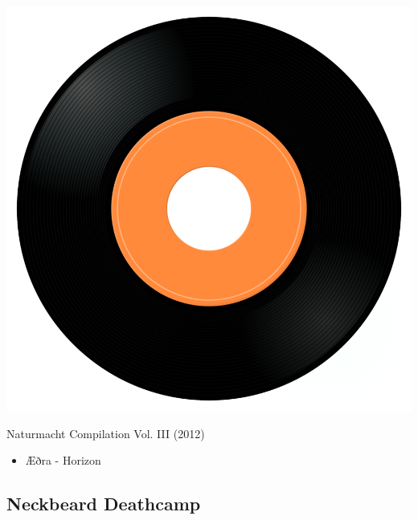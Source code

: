 \begin{minipage}[t]{0.25\textwidth}\vspace{0pt}
\captionsetup{type=figure}
\includegraphics[width=\textwidth]{Images/cover.png}
\caption*{Naturmacht Compilation Vol. III (2012)}
\end{minipage}
\begin{minipage}[t]{0.25\textwidth}\vspace{0pt}
\begin{itemize}[nosep,leftmargin=1em,labelwidth=*,align=left]
	\setlength{\itemsep}{0pt}
	\item Æðra - Horizon
\end{itemize}
\end{minipage}

\subsection{Neckbeard Deathcamp}

